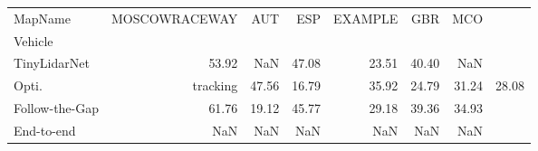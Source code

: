 \begin{tabular}{lrrrrrr}
\toprule
MapName & MOSCOWRACEWAY & AUT & ESP & EXAMPLE & GBR & MCO \\
Vehicle &  &  &  &  &  &  \\
\midrule
TinyLidarNet & 53.92 & NaN & 47.08 & 23.51 & 40.40 & NaN \\
Opti. & tracking & 47.56 & 16.79 & 35.92 & 24.79 & 31.24 & 28.08 \\
Follow-the-Gap & 61.76 & 19.12 & 45.77 & 29.18 & 39.36 & 34.93 \\
End-to-end & NaN & NaN & NaN & NaN & NaN & NaN \\
\bottomrule
\end{tabular}
